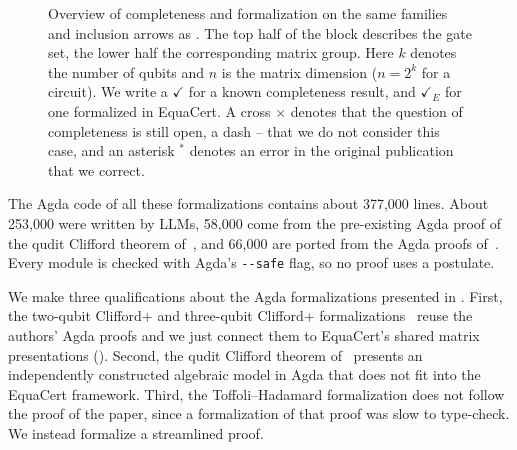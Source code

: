 \documentclass[acmsmall,screen,nonacm]{acmart}
\begin{document}
\begin{figure}[!tbp]
\centering
\resizebox{\linewidth}{!}{\unskip}
\caption{Overview of completeness and formalization on the same families and inclusion arrows as . 
The top half of the block describes the gate set, the lower half the corresponding matrix group. Here $k$ denotes the number of qubits and $n$ is the matrix dimension ($n=2^k$ for a circuit). We write a $\checkmark$ for a known completeness result, and $\checkmark_E$ for one formalized in EquaCert. A cross $\times$ denotes that the question of completeness is still open, a dash -- that we do not consider this case, and an asterisk $^*$ denotes an error in the original publication that we correct.
}\label{fig:qubit-progress}
\end{figure}

The Agda code of all these formalizations contains about 377{,}000 lines. About 253{,}000 were written by LLMs, 58{,}000 come from the pre-existing Agda proof of the qudit Clifford theorem of~\quditcite{}, and 66{,}000 are ported from the Agda proofs of~\cite{bian2023cliffordt2,bian2023cliffordcs3}. Every module is checked with Agda's \texttt{-{}-safe} flag, so no proof uses a postulate. 

We make three qualifications about the Agda formalizations presented in . 
First, the two-qubit Clifford+\T{} and three-qubit Clifford+\CS{} formalizations~\cite{bian2023cliffordt2,bian2023cliffordcs3} reuse the authors' Agda proofs and we just connect them to EquaCert's shared matrix presentations (). 
Second, the qudit Clifford theorem of~\quditcite{} presents an independently constructed algebraic model in Agda that does not fit into the EquaCert framework.
Third, the Toffoli--Hadamard formalization does not follow the proof of the paper, since a formalization of that proof was slow to type-check. We instead formalize a streamlined proof. 
\end{document}
